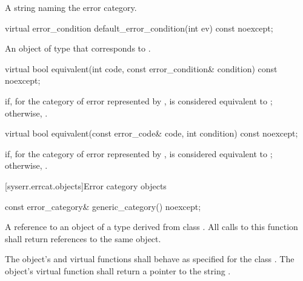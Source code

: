 \begin{itemdescr}
\pnum
\returns
A string naming the error category.
\end{itemdescr}

%
\begin{itemdecl}
virtual error_condition default_error_condition(int ev) const noexcept;
\end{itemdecl}

\begin{itemdescr}
\pnum
\returns
An object of type  that corresponds to .
\end{itemdescr}

%
\begin{itemdecl}
virtual bool equivalent(int code, const error_condition& condition) const noexcept;
\end{itemdecl}

\begin{itemdescr}
\pnum
\returns
{} if, for the category of error represented by ,  is considered equivalent to ; otherwise, .
\end{itemdescr}

%
\begin{itemdecl}
virtual bool equivalent(const error_code& code, int condition) const noexcept;
\end{itemdecl}

\begin{itemdescr}
\pnum
\returns
{} if, for the category of error represented by ,  is considered equivalent to ; otherwise, .
\end{itemdescr}

[syserr.errcat.objects]{Error category objects}

%
\begin{itemdecl}
const error_category& generic_category() noexcept;
\end{itemdecl}

\begin{itemdescr}
\pnum
\returns
A reference to an object of a type derived from class .
All calls to this function shall return references to the same object.

\pnum
\remarks
The object's  and  virtual functions shall behave as specified for the class . The object's  virtual function shall return a pointer to the string .
\end{itemdescr}

